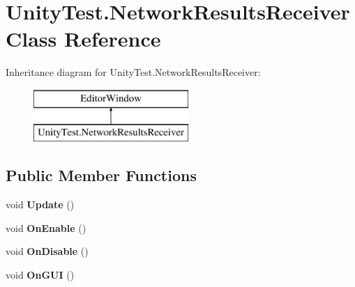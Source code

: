 \hypertarget{class_unity_test_1_1_network_results_receiver}{}\section{Unity\+Test.\+Network\+Results\+Receiver Class Reference}
\label{class_unity_test_1_1_network_results_receiver}
Inheritance diagram for Unity\+Test.\+Network\+Results\+Receiver\+:\begin{figure}[H]
\begin{center}
\leavevmode
\includegraphics[height=2.000000cm]{class_unity_test_1_1_network_results_receiver}
\end{center}
\end{figure}
\subsection*{Public Member Functions}
\begin{DoxyCompactItemize}
\item 
\mbox{\label{class_unity_test_1_1_network_results_receiver_a476056373c149bb086039afc627cb4c7}} 
void {\bfseries Update} ()
\item 
\mbox{\label{class_unity_test_1_1_network_results_receiver_a8cef4b76bc037d6baf0f20cb39abfe6b}} 
void {\bfseries On\+Enable} ()
\item 
\mbox{\label{class_unity_test_1_1_network_results_receiver_ad1462117a3908bde05816d6709249056}} 
void {\bfseries On\+Disable} ()
\item 
\mbox{\label{class_unity_test_1_1_network_results_receiver_aa4d42ede43a46f1a3a95751ad76ea740}} 
void {\bfseries On\+G\+UI} ()
\end{DoxyCompactItemize}
